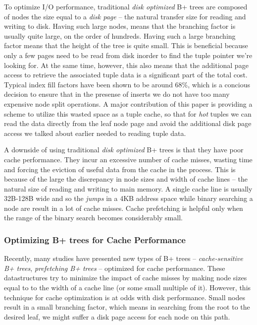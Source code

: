 \documentclass{article}
\begin{document}
To optimize I/O performance, traditional \textit{disk optimized} B+ trees are composed of nodes the size equal to a \textit{disk page} -- the natural transfer size for reading and writing to disk. Having such large nodes, means that the branching factor is usually quite large, on the order of hundreds. Having such a large branching factor means that the height of the tree is quite small. This is beneficial because only a few pages need to be read from disk inorder to find the tuple pointer we're looking for. At the same time, however, this also means that the additional page access to retrieve the associated tuple data is a significant part of the total cost. Typical index fill factors have been shown to be around 68\%, which is a concious decision to ensure that in the presense of inserts we do not have too many expensive node split operations. A major contribution of this paper is providing a scheme to utilize this wasted space as a tuple cache, so that for \textit{hot} tuples we can read the data directly from the leaf node page and avoid the additional disk page access we talked about earlier needed to reading tuple data.

A downside of using traditional \textit{disk optimized} B+ trees is that they have poor cache performance. They incur an excessive number of cache misses, wasting time and forcing the eviction of useful data from the cache in the process. This is because of the large the discrepancy in node sizes and width of cache lines -- the natural size of reading and writing to main memory. A single cache line is usually 32B-128B wide and so the \textit{jumps} in a 4KB address space while binary searching a node are result in a lot of cache misses. Cache prefetching is helpful only when the range of the binary search becomes considerably small.

\subsubsection{Optimizing B+ trees for Cache Performance}

Recently, many studies have presented new types of B+ trees -- \textit{cache-sensitive B+ trees}, \textit{prefetching B+ trees} -- optimized for cache performance. These datastructures try to minimize the impact of cache misses by making node sizes equal to to the width of a cache line (or some small multiple of it). However, this technique for cache optimization is at odds with disk performance. Small nodes result in a small branching factor, which means in searching from the root to the desired leaf, we might suffer a disk page access for each node on this path.
\end{document}
